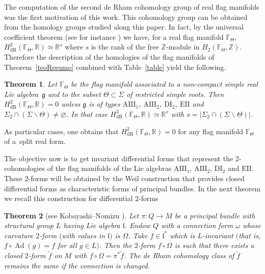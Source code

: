 \documentclass[10pt,a4paper]{amsart}
\numberwithin{equation}{section}
\newtheorem{Theorem}{Theorem}[section]
\begin{document}
The computation of the second de Rham cohomology group of real flag manifolds was the first motivation of this work. This cohomology group can be obtained from the homology groups studied along this paper. In fact, by the universal coefficient theorem (see for instance \cite{Ha}) we have, for a real flag manifold $\mathbb{F}_{\Theta }$, $H_{\mathrm{dR}}^{2}(\mathbb{F}_{\Theta },\mathbb{R})\simeq \mathbb{R}^{s}$ where $s$ is the rank of the free $\mathbb{Z}$-module in $H_{2}(\mathbb{F}_{\Theta },\mathbb{Z})$. Therefore the description of the homologies of the flag manifolds of Theorem~\ref{teoResumo} combined with Table~\ref{table} yield the following.

\begin{Theorem}\label{tedeRham}Let $\mathbb{F}_{\Theta }$ be the flag manifold associated to a non-compact simple real Lie algebra~$\mathfrak{g}$ and to the subset $\Theta \subset \Sigma $ of restricted simple roots. Then $H_{\mathrm{dR}}^{2}(\mathbb{F}_{\Theta },\mathbb{R})=0$ unless $\mathfrak{g}$ is of types $\mathrm{AIII_{1}}$, $\mathrm{AIII_{2}}$, $\mathrm{DI_{2}}$, $\mathrm{EII}$ and $\Sigma _{2}\cap (\Sigma \backslash \Theta )\neq \varnothing $. In that case $H_{\mathrm{dR}}^{2}(\mathbb{F}_{\Theta },\mathbb{R})\simeq \mathbb{R}^{s}$ with $s=\vert \Sigma _{2}\cap (\Sigma \backslash \Theta)\vert $.
\end{Theorem}

As particular cases, one obtains that $H_{\mathrm{dR}}^{2}(\mathbb{F}_{\Theta },\mathbb{R})=0$ for any flag manifold $\mathbb{F}_{\Theta }$ of a~split real form.

The objective now is to get invariant differential forms that represent the $2$-cohomologies of the flag manifolds of the Lie algebras $\mathrm{AIII_{1}}$, $\mathrm{AIII_{2}}$, $\mathrm{DI_{2}}$ and $\mathrm{EII}$. These $2$-forms will be obtained by the Weil construction that provides closed differential forms as characteristic forms of principal bundles. In the next theorem we recall this construction for differential $2$-forms

\begin{Theorem}[{see Kobayashi--Nomizu \cite[Chapter XII]{kn}}]\label{teoWeilhomo} Let $\pi\colon Q\rightarrow M$ be a principal bundle with structural group $L$ having Lie algebra $\mathfrak{l}$. Endow $Q$ with a connection form $\omega $ whose curvature $2$-form $($with values in $\mathfrak{l})$ is $\Omega $. Take $f\in \mathfrak{l}^{\ast }$ which is $L$-invariant $($that is, $f\circ \operatorname{Ad} (g) =f$ for all $g\in L)$. Then the $2$-form $f\circ \Omega $ is such that there exists a closed $2$-form $\widetilde{f}$ on $M$ with $f\circ \Omega =\pi ^{\ast }\widetilde{f}$. The de Rham cohomology class of $\widetilde{f}$ remains the same if the connection is changed.
\end{Theorem}
\end{document}
